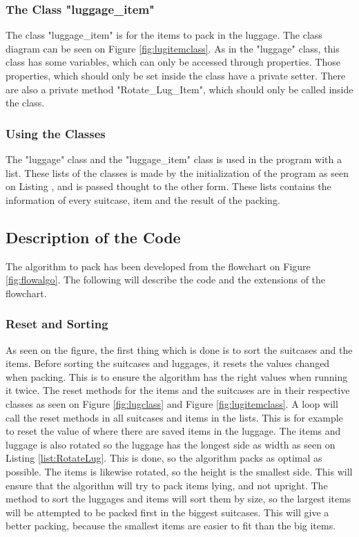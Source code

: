 \subsubsection{The Class "luggage\_item"}
The class "luggage\_item" is for the items to pack in the luggage. The class diagram can be seen on Figure \ref{fig:lugitemclass}. As in the "luggage" class, this class has some variables, which can only be accessed through properties. Those properties, which should only be set inside the class have a private setter. There are also a private method "Rotate\_Lug\_Item", which should only be called inside the class.
\subsubsection{Using the Classes}
The "luggage" class and the "luggage\_item" class is used in the program with a list. These lists of the classes is made by the initialization of the program as seen on Listing , and is passed thought to the other form. These lists contains the information of every suitcase, item and the result of the packing.
\subsection{Description of the Code}
The algorithm to pack has been developed from the flowchart on Figure \ref{fig:flowalgo}. The following will describe the code and the extensions of the flowchart.
\subsubsection{Reset and Sorting}
As seen on the figure, the first thing which is done is to sort the suitcases and the items. Before sorting the suitcases and luggages, it resets the values changed when packing. This is to ensure the algorithm has the right values when running it twice. The reset methods for the items and the suitcases are in their respective classes as seen on Figure \ref{fig:lugclass} and Figure \ref{fig:lugitemclass}. A loop will call the reset methods in all suitcases and items in the lists. This is for example to reset the value of where there are saved items in the luggage. The items and luggage is also rotated so the luggage has the longest side as width as seen on Listing \ref{list:RotateLug}. This is done, so the algorithm packs as optimal as possible. The items is likewise rotated, so the height is the smallest side. This will ensure that the algorithm will try to pack items lying, and not upright.
The method to sort the luggages and items will sort them by size, so the largest items will be attempted to be packed first in the biggest suitcases. This will give a better packing, because the smallest items are easier to fit than the big items.
